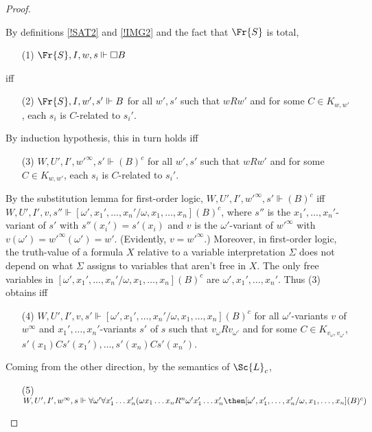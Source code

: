 \documentclass[11pt]{woarticle}
\theoremstyle{break}
\theoremstyle{nonumberplain}
\newcommand{\SAT}{\Vdash}
\newcommand{\1}{\;\,|\;\,}
\newcommand{\trans}[1]{(#1)^c}
\begin{document}
{\begin{proof}
\begin{enumerate}
    By definitions \ref{!SAT2} and \ref{!IMG2} and the fact that
    $\Fr{S}$ is total,
    \begin{itemize}
    \item[(1)] $\Fr{S},I,w,s \SAT \Box B$
    \end{itemize}
    iff
    \begin{itemize}
    \item[(2)] $\Fr{S},I,w',s' \SAT B$ for all $w',s'$ such that
      $wRw'$ and for some $C\in K_{w,w'}$, each $s_i$ is $C$-related
      to $s_i'$.
    \end{itemize}
    By induction hypothesis, this in turn holds iff
    \begin{itemize}
    \item[(3)] $W,U',I',{w'}^\infty,s' \SAT \trans{B}$ for all $w',s'$ such
      that $wRw'$ and for some $C\in K_{w,w'}$, each $s_i$ is
      $C$-related to $s_i'$.
    \end{itemize}
    By the substitution lemma for first-order logic,
    $W,U',I',{w'}^\infty,s' \SAT \trans{B}$ iff $W,U',I',v,s'' \SAT
    [\omega',x_1',\ldots,x_n'/\omega,x_1,\ldots,x_n] \trans{B}$, where
    $s''$ is the $x_1',\ldots,x_n'$-variant of $s'$ with $s''(x_i') =
    s'(x_i)$ and $v$ is the $\omega'$-variant of ${w'}^\infty$ with
    $v(\omega') = {w'}^\infty(\omega') = w'$. (Evidently, $v =
    {w'}^\infty$.)  Moreover, in first-order logic, the truth-value of
    a formula $X$ relative to a variable interpretation $\Sigma$ does
    not depend on what $\Sigma$ assigns to variables that aren't free
    in $X$. The only free variables in
    $[\omega',x_1',\ldots,x_n'/\omega,x_1,\ldots,x_n] \trans{B}$ are
    $\omega',x_1',\ldots,x_n'$. Thus (3) obtains iff
    \begin{itemize}
    \item[(4)] $W,U',I',v,s' \SAT
      [\omega',x_1',\ldots,x_n'/\omega,x_1,\ldots,x_n] \trans{B}$ for
      all $\omega'$-variants $v$ of $w^\infty$ and
      $x_1',\ldots,x_n'$-variants $s'$ of $s$ such that
      $v_{\omega}Rv_{\omega'}$ and for some $C\in
      K_{v_{\omega},v_{\omega'}}$,
      $s'(x_1)Cs'(x_1'),\ldots,s'(x_n)Cs'(x_n')$.
    \end{itemize}
    Coming from the other direction, by the semantics of $\Sc{L}_c$,
    \begin{itemize}
    \item[(5)] $W,U',I',w^\infty,s \SAT \forall \omega' \forall x_1'\ldots
      x_n'(\omega x_1\ldots x_n R^n \omega' x_1'\ldots x_n' \then
      [\omega',x_1',\ldots,x_n'/\omega,x_1,\ldots,x_n]\trans{B})$

\end{itemize}
\end{enumerate}
\end{proof}}
\end{document}
